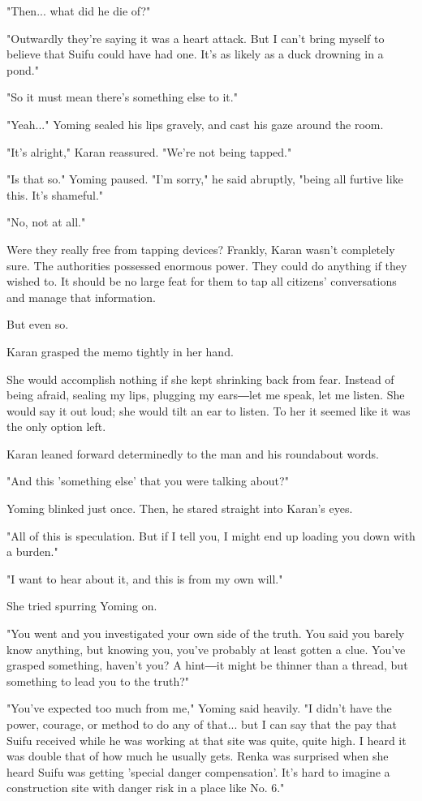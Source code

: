 "Then... what did he die of?"

"Outwardly they're saying it was a heart attack. But I can't bring
myself to believe that Suifu could have had one. It's as likely as a
duck drowning in a pond."

"So it must mean there's something else to it."

"Yeah..." Yoming sealed his lips gravely, and cast his gaze around the
room.

"It's alright," Karan reassured. "We're not being tapped."

"Is that so." Yoming paused. "I'm sorry," he said abruptly, "being all
furtive like this. It's shameful."

"No, not at all."

Were they really free from tapping devices? Frankly, Karan wasn't
completely sure. The authorities possessed enormous power. They could do
anything if they wished to. It should be no large feat for them to tap
all citizens' conversations and manage that information.

But even so.

Karan grasped the memo tightly in her hand.

She would accomplish nothing if she kept shrinking back from fear.
Instead of being afraid, sealing my lips, plugging my ears―let me speak,
let me listen. She would say it out loud; she would tilt an ear to
listen. To her it seemed like it was the only option left.

Karan leaned forward determinedly to the man and his roundabout words.

"And this 'something else' that you were talking about?"

Yoming blinked just once. Then, he stared straight into Karan's eyes.

"All of this is speculation. But if I tell you, I might end up loading
you down with a burden."

"I want to hear about it, and this is from my own will."

She tried spurring Yoming on.

"You went and you investigated your own side of the truth. You said you
barely know anything, but knowing you, you've probably at least gotten a
clue. You've grasped something, haven't you? A hint―it might be thinner
than a thread, but something to lead you to the truth?"

"You've expected too much from me," Yoming said heavily. "I didn't have
the power, courage, or method to do any of that... but I can say that
the pay that Suifu received while he was working at that site was quite,
quite high. I heard it was double that of how much he usually gets.
Renka was surprised when she heard Suifu was getting 'special danger
compensation'. It's hard to imagine a construction site with danger risk
in a place like No. 6."

